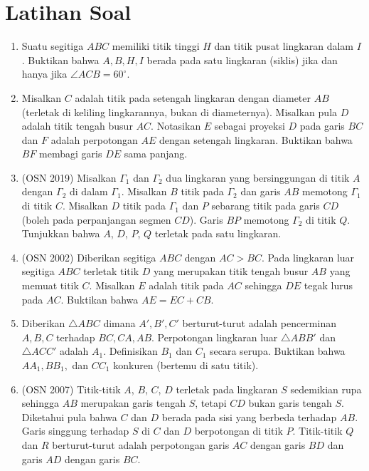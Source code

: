 \documentclass[11pt]{scrartcl}
\begin{document}
    \section{Latihan Soal}
    \begin{enumerate}
        \item Suatu segitiga $ABC$ memiliki titik tinggi $H$ dan titik pusat lingkaran dalam $I$. Buktikan bahwa $A,B,H,I$ berada pada satu lingkaran (siklis) jika dan hanya jika $\angle ACB = 60^\circ$.
        
        \item Misalkan $C$ adalah titik pada setengah lingkaran dengan diameter $AB$ (terletak di keliling lingkarannya, bukan di diameternya). Misalkan pula $D$ adalah titik tengah busur $AC$. Notasikan $E$ sebagai proyeksi $D$ pada garis $BC$ dan $F$ adalah perpotongan $AE$ dengan setengah lingkaran. Buktikan bahwa $BF$ membagi garis $DE$ sama panjang.
        
        \item (OSN 2019) Misalkan $\Gamma_1$ dan $\Gamma_2$ dua lingkaran yang bersinggungan di titik $A$ dengan $\Gamma_2$ di dalam $\Gamma_1$. Misalkan $B$ titik pada $\Gamma_2$ dan garis $AB$ memotong $\Gamma_1$ di titik $C$. Misalkan $D$ titik pada $\Gamma_1$ dan $P$ sebarang titik pada garis $CD$ (boleh pada perpanjangan segmen $CD$). Garis $BP$ memotong $\Gamma_2$ di titik $Q$. Tunjukkan bahwa $A$, $D$, $P$, $Q$ terletak pada satu lingkaran.

        \item (OSN 2002) Diberikan segitiga $ABC$ dengan $AC > BC$. Pada lingkaran luar segitiga $ABC$ terletak titik $D$ yang merupakan titik tengah busur $AB$ yang memuat titik $C$. Misalkan $E$ adalah titik pada $AC$ sehingga $DE$ tegak lurus pada $AC$. Buktikan bahwa $AE = EC + CB$.

        \item Diberikan $\triangle ABC$ dimana $A',B',C'$ berturut-turut adalah pencerminan $A,B,C$ terhadap $BC,CA,AB$. Perpotongan lingkaran luar $\triangle ABB'$ dan $\triangle ACC'$ adalah $A_1$. Definisikan $B_1$ dan $C_1$ secara serupa. Buktikan bahwa $AA_1,BB_1,$ dan $CC_1$ konkuren (bertemu di satu titik).

        \item (OSN 2007) Titik-titik $A$, $B$, $C$, $D$ terletak pada lingkaran $S$ sedemikian rupa sehingga $AB$ merupakan garis tengah $S$, tetapi $CD$ bukan garis tengah $S$. Diketahui pula bahwa $C$ dan $D$ berada pada sisi yang berbeda terhadap $AB$. Garis singgung terhadap $S$ di $C$ dan $D$ berpotongan di titik $P$. Titik-titik $Q$ dan $R$ berturut-turut adalah perpotongan garis $AC$ dengan garis $BD$ dan garis $AD$ dengan garis $BC$.
        

\end{enumerate}
\end{document}
